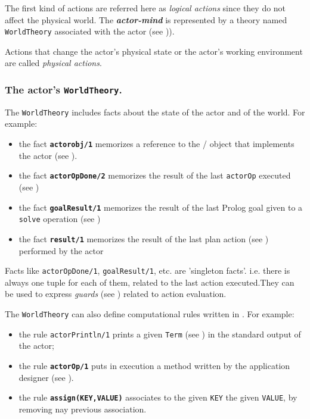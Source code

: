 The first kind of actions are referred here as \textit{logical actions} since they do not affect the physical world.
The \textit{\textbf{actor-mind}} is represented by a \tuprolog{} theory named \texttt{WorldTheory} associated with the actor (see )). 

Actions that change the actor's physical state or the actor's working environment are called \textit{physical actions}.
 


\subsubsection{The actor's  \texttt{WorldTheory}.}

The  \texttt{WorldTheory} includes  facts about the state of the actor and of the world. 
For example:
\begin{itemize}
\item the fact \texttt{\textbf{actorobj/1}} memorizes a reference to the \java{}/\akka{} object that implements the actor (see ).
\item the fact \texttt{\textbf{actorOpDone/2}} memorizes the result of the last \texttt{actorOp} executed (see )
\item the fact \texttt{\textbf{goalResult/1}} memorizes the result of the last Prolog goal given to a \texttt{solve} operation (see )
\item  the fact \texttt{\textbf{result/1}} memorizes the result of the last plan action (see ) performed by the actor
\end{itemize}

Facts like \texttt{actorOpDone/1}, \texttt{goalResult/1}, etc. are 'singleton facts'. i.e. there is always one tuple for each of them, related to the last action executed.They can be used to express \textit{guards} (see ) related to action evaluation.


The  \texttt{WorldTheory} can also define computational rules written in \tuprolog{}. For example:
\begin{itemize}
\item the rule \texttt{actorPrintln/1} prints a given \tuprolog{} \texttt{Term} (see ) in the standard output of the actor;
\item the rule \texttt{\textbf{actorOp/1}} puts in execution a \java{} method written by the application designer (see ).
\item the rule \texttt{\textbf{assign(KEY,VALUE)}} associates to the given \texttt{KEY} the given \texttt{VALUE}, by removing nay previous association. 
\end{itemize}


